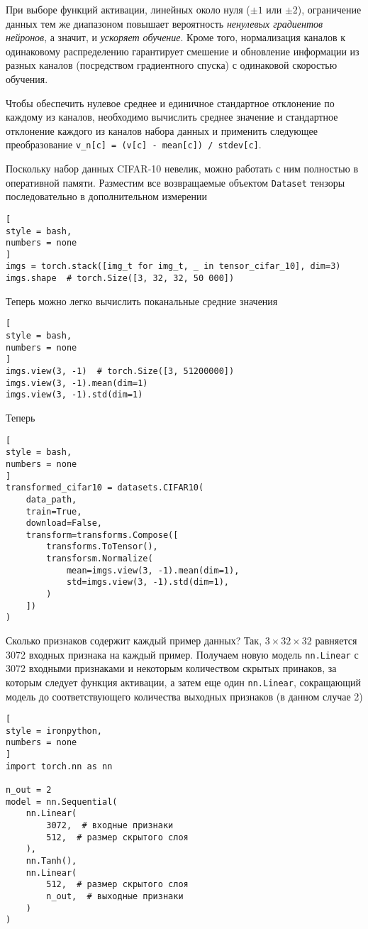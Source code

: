 \documentclass[%
	11pt,
	a4paper,
	utf8,
		]{article}
\begin{document}
При выборе функций активации, линейных около нуля ($\pm 1$ или $\pm 2$), ограничение данных тем же диапазоном повышает вероятность \emph{ненулевых градиентов нейронов}, а значит, и \emph{ускоряет обучение}. Кроме того, нормализация каналов к одинаковому распределению гарантирует смешение и обновление информации из разных каналов (посредством градиентного спуска) с одинаковой скоростью обучения.

Чтобы обеспечить нулевое среднее и единичное стандартное отклонение по каждому из каналов, необходимо вычислить среднее значение и стандартное отклонение каждого из каналов набора данных и применить следующее преобразование \verb|v_n[c] = (v[c] - mean[c]) / stdev[c]|. 

Поскольку набор данных CIFAR-10 невелик, можно работать с ним полностью в оперативной памяти. Разместим все возвращаемые объектом \verb|Dataset| тензоры последовательно в дополнительном измерении
\begin{lstlisting}[
style = bash,
numbers = none
]
imgs = torch.stack([img_t for img_t, _ in tensor_cifar_10], dim=3)
imgs.shape  # torch.Size([3, 32, 32, 50 000])
\end{lstlisting}

Теперь можно легко вычислить поканальные средние значения
\begin{lstlisting}[
style = bash,
numbers = none
]
imgs.view(3, -1)  # torch.Size([3, 51200000])
imgs.view(3, -1).mean(dim=1)
imgs.view(3, -1).std(dim=1)
\end{lstlisting}

Теперь
\begin{lstlisting}[
style = bash,
numbers = none
]
transformed_cifar10 = datasets.CIFAR10(
    data_path,
    train=True,
    download=False,
    transform=transforms.Compose([
        transforms.ToTensor(),
        transforsm.Normalize(
            mean=imgs.view(3, -1).mean(dim=1),
            std=imgs.view(3, -1).std(dim=1),
        )
    ])
)
\end{lstlisting}

Сколько признаков содержит каждый пример данных? Так, $3 \times 32 \times 32$ равняется 3072 входных признака на каждый пример. Получаем новую модель \verb|nn.Linear| с 3072 входными признаками и некоторым количеством скрытых принаков, за которым следует функция активации, а затем еще один \verb|nn.Linear|, сокращающий модель до соответствующего количества выходных признаков (в данном случае 2)
\begin{lstlisting}[
style = ironpython,
numbers = none
]
import torch.nn as nn

n_out = 2
model = nn.Sequential(
    nn.Linear(
        3072,  # входные признаки
        512,  # размер скрытого слоя
    ),
    nn.Tanh(),
    nn.Linear(
        512,  # размер скрытого слоя
        n_out,  # выходные признаки
    )
)
\end{lstlisting}
\end{document}
